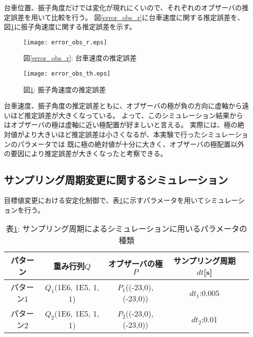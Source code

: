台車位置、振子角度だけでは変化が現れにくいので、それぞれのオブザーバの推定誤差を用いて比較を行う。
図\ref{error_obs_r}に台車速度に関する推定誤差を、図\ref{error_obs_th}に振子角速度に関する推定誤差を示す。

\begin{figure}[htbp]
    \begin{minipage}{0.5\hsize}
        \begin{center}
            \texttt{[image: error\_obs\_r.eps]}
            \caption{図\ref{error_obs_r}: 台車速度の推定誤差}
            \label{error_obs_r}
        \end{center}
    \end{minipage}
    \begin{minipage}{0.5\hsize}
        \begin{center}
            \texttt{[image: error\_obs\_th.eps]}
            \caption{図\ref{error_obs_th}: 振子角速度の推定誤差}
            \label{error_obs_th}
        \end{center}
    \end{minipage}
\end{figure}

台車速度、振子角度の推定誤差ともに、オブザーバの極が負の方向に虚軸から遠いほど推定誤差が大きくなっている。
よって、このシミュレーション結果からはオブザーバの極は虚軸に近い極配置が好ましいと言える。
実際には、極の絶対値がより大きいほど推定誤差は小さくなるが、本実験で行ったシミュレーションのパラメータでは
既に極の絶対値が十分に大きく、オブザーバの極配置以外の要因により推定誤差が大きくなったと考察できる。


\subsection{サンプリング周期変更に関するシミュレーション}
目標値変更における安定化制御で、表\ref{sim_Dt}に示すパラメータを用いてシミュレーションを行う。

\begin{table}[htbp]
    \begin{center}
        \caption{表\ref{sim_Dt}: サンプリング周期によるシミュレーションに用いるパラメータの種類}
        \begin{tabular}{|c|c|c|c|c|} \hline
            パターン & 重み行列$Q$ & オブザーバの極$P$ & サンプリング周期$dt$[s] \\ \hline \hline
            パターン1 & $Q_1$(1E6, 1E5, 1, 1) & $P_1$((-23,0), (-23,0)) & $dt_1$:0.005 \\ \hline
            パターン2 & $Q_2$(1E6, 1E5, 1, 1) & $P_2$((-23,0), (-23,0)) & $dt_2$:0.01 \\ \hline
        \end{tabular}
        \label{sim_Dt}
    \end{center}
\end{table}

